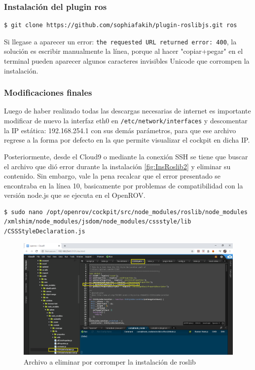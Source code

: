 \subsubsection{Instalación del plugin ros}
\begin{verbatim}
$ git clone https://github.com/sophiafakih/plugin-roslibjs.git ros    
\end{verbatim}

Si llegase a aparecer un error: \verb|the requested URL returned error: 400|, la solución es escribir manualmente la línea, porque al hacer "copiar+pegar" en el terminal pueden aparecer algunos caracteres invisibles Unicode que corrompen la instalación.

\subsubsection{Modificaciones finales}
\par Luego de haber realizado todas las descargas necesarias de internet es importante modificar de nuevo la interfaz eth0 en \verb|/etc/network/interfaces| y descomentar la IP estática: 192.168.254.1 con sus demás parámetros, para que ese archivo regrese a la forma por defecto en la que permite visualizar el cockpit en dicha IP. 

\par Posteriormente, desde el Cloud9 o mediante la conexión SSH se tiene que buscar el archivo que dió error durante la instalación \ref{fig:InsRoslib2} y eliminar su contenido. Sin embargo, vale la pena recalcar que el error presentado se encontraba en la línea 10, basicamente por problemas de compatibilidad con la versión node.js que se ejecuta en el OpenROV.

\begin{verbatim}
$ sudo nano /opt/openrov/cockpit/src/node_modules/roslib/node_modules
/xmlshim/node_modules/jsdom/node_modules/cssstyle/lib
/CSSStyleDeclaration.js
\end{verbatim}

        \begin{figure}[H]
            \centering
            \includegraphics[scale=0.40]{partes/ImgSophia/ApendiceB/ArchivoAEliminar.png}
            \caption{Archivo a eliminar por corromper la instalación de roslib}
            \label{fig:FileToDelete}
        \end{figure}

